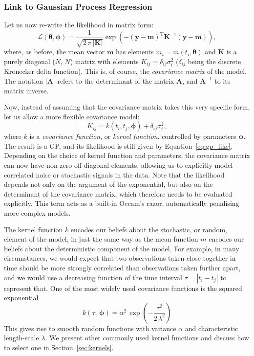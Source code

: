 \documentclass[letterpaper]{ar-1col}
\newcommand{\hyperparams}{\ensuremath{\boldsymbol{\phi}}}
\newcommand{\meanparams}{\ensuremath{\boldsymbol{\theta}}}
\newcommand{\dt}{\ensuremath{\tau}}
\newcommand{\amplitude}{\ensuremath{\alpha}}
\newcommand{\lengthscale}{\ensuremath{\lambda}}
\begin{document}
\subsubsection{Link to Gaussian Process Regression}\label{sec:gp-lsq-link}
Let us now re-write the likelihood in matrix form:
\begin{equation}
\label{eq:gp_like}
  \mathcal{L}(\meanparams,\hyperparams) = 
  \frac{1}{\sqrt{2\,\pi\,|\mathbf{K}|}} \exp \left(-(\mathbf{y}-\mathbf{m})^{\mathrm{T}} \mathbf{K}^{-1}
  (\mathbf{y}-\mathbf{m}) \right),
\end{equation}
where, as before, the mean vector $\mathbf{m}$ has elements $m_i=m(t_i,\meanparams)$ and $\mathbf{K}$ is a purely diagonal ($N$, $N$) matrix with elements $K_{ij} = \delta_{ij} \sigma_i^2$ ($\delta_{ij}$ being the discrete Kronecker delta function). This is, of course, the \emph{covariance matrix} of the model. The notation $|\mathbf{A}|$ refers to the determinant of the matrix $\mathbf{A}$, and $\mathbf{A}^{-1}$ to its matrix inverse.

Now, instead of assuming that the covariance matrix takes this very specific form, let us allow a more flexible covariance model:
\begin{equation}
  K_{ij} = k(t_i,t_j,\hyperparams) + \delta_{ij} \sigma_i^2,
\end{equation}
where $k$ is a \emph{covariance function}, or \emph{kernel function}, controlled by parameters $\hyperparams$. The result is a GP, and its likelihood is still given by Equation~\ref{eq:gp_like}. Depending on the choice of kernel function and parameters, the covariance matrix can now have non-zero off-diagonal elements, allowing us to explicitly model correlated noise or stochastic signals in the data.
Note that the likelihood depends not only on the argument of the exponential, but also on the determinant of the covariance matrix, which therefore needs to be evaluated explicitly. This term acts as a built-in Occam's razor, automatically penalising more complex models.

The kernel function $k$ encodes our beliefs about the stochastic, or random, element of the model, in just the same way as the mean function $m$ encodes our beliefs about the deterministic component of the model. For example, in many circumstances, we would expect that two observations taken close together in time should be more strongly correlated than observations taken further apart, and we would use a decreasing function of the time interval $\dt=|t_i-t_j|$ to represent that. One of the most widely used covariance functions is the squared exponential
\begin{equation}
\label{eq:kse}
  k(\dt;\,\hyperparams) = \amplitude^2\,\exp\left(-\frac{\dt^2}{2\,\lengthscale^2}\right)
\end{equation}
This gives rise to smooth random functions with variance $\amplitude$ and characteristic length-scale $\lambda$. We present other commonly used kernel functions and discuss how to select one in Section~\ref{sec:kernels}.
\end{document}
